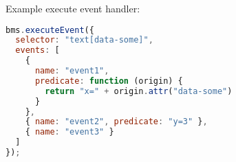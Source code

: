 %

Example execute event handler:

\begin{lstlisting}[language=JavaScript]
bms.executeEvent({
  selector: "text[data-some]",
  events: [
    { 
      name: "event1", 
      predicate: function (origin) {
        return "x=" + origin.attr("data-some") 
      }
    },
    { name: "event2", predicate: "y=3" },
    { name: "event3" } 
  ]
});
\end{lstlisting}
